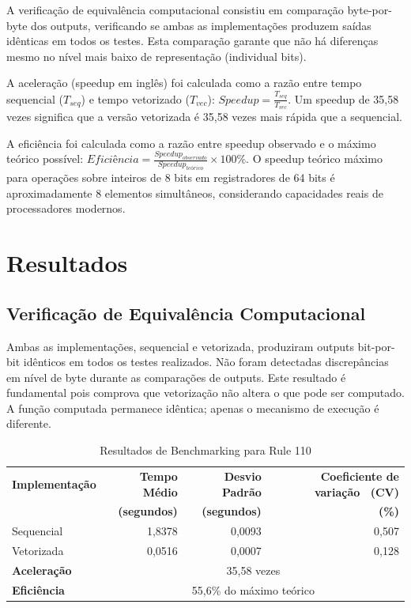 \documentclass[12pt]{article}
\begin{document}
A verificação de equivalência computacional consistiu em comparação byte-por-byte dos outputs, verificando se ambas as implementações produzem saídas idênticas em todos os testes. Esta comparação garante que não há diferenças mesmo no nível mais baixo de representação (individual bits).

A aceleração (speedup em inglês) foi calculada como a razão entre tempo sequencial ($T_{seq}$) e tempo vetorizado ($T_{vec}$): $Speedup = \frac{T_{seq}}{T_{vec}}$. Um speedup de 35,58 vezes significa que a versão vetorizada é 35,58 vezes mais rápida que a sequencial.

A eficiência foi calculada como a razão entre speedup observado e o máximo teórico possível: $Eficiência = \frac{Speedup_{observado}}{Speedup_{teórico}} \times 100\%$. O speedup teórico máximo para operações sobre inteiros de 8 bits em registradores de 64 bits é aproximadamente 8 elementos simultâneos, considerando capacidades reais de processadores modernos.

\section{Resultados}

\subsection{Verificação de Equivalência Computacional}

Ambas as implementações, sequencial e vetorizada, produziram outputs bit-por-bit idênticos em todos os testes realizados. Não foram detectadas discrepâncias em nível de byte durante as comparações de outputs. Este resultado é fundamental pois comprova que vetorização não altera o que pode ser computado. A função computada permanece idêntica; apenas o mecanismo de execução é diferente.

\begin{table}[H]
\centering
\caption{Resultados de Benchmarking para Rule 110}
\label{tab:resultados}
\begin{tabular}{|l|r|r|r|}
\hline
\textbf{Implementação} & \textbf{Tempo Médio} & \textbf{Desvio Padrão} & \textbf{Coeficiente de variação \ (CV)} \\
& \textbf{(segundos)} & \textbf{(segundos)} & \textbf{(\%)} \\
\hline
Sequencial & 1,8378 & 0,0093 & 0,507 \\
Vetorizada & 0,0516 & 0,0007 & 0,128 \\
\hline
\textbf{Aceleração} & \multicolumn{3}{c|}{35,58 vezes} \\
\hline
\textbf{Eficiência} & \multicolumn{3}{c|}{55,6\% do máximo teórico} \\
\hline
\end{tabular}
\end{table}
\end{document}
